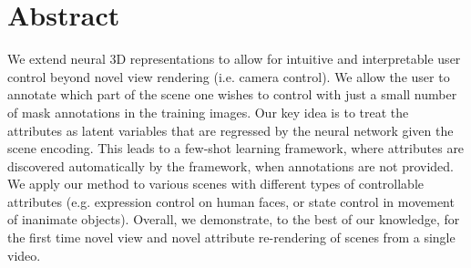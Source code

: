 \section{Abstract}
  We extend neural 3D representations to allow for intuitive and interpretable
  user control beyond novel view rendering (i.e. camera control).
  We allow the user to annotate which part of the scene one wishes to control
  with just a small number of mask annotations in the training images.
  Our key idea is to treat the attributes as latent variables that are
  regressed by the neural network given the scene encoding.
  This leads to a few-shot learning framework, where attributes are discovered
  automatically by the framework, when annotations are not provided.
  We apply our method to various scenes with different types of controllable
  attributes (e.g. expression control on human faces, or state control in
  movement of inanimate objects).
  Overall, we demonstrate, to the best of our knowledge, for the first time
  novel view and novel attribute re-rendering of scenes from a single video.
